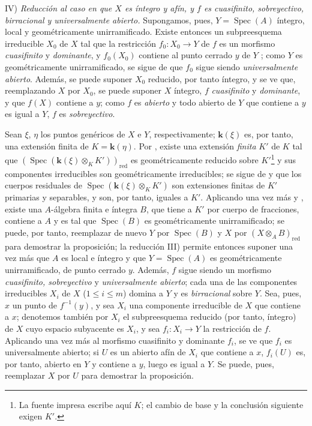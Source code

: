 IV) \emph{Reducción al caso en que $X$ es íntegro y afín, y $f$ es cuasifinito, sobreyectivo, birracional y universalmente abierto.}
Supongamos, pues, $Y=\operatorname{Spec}(A)$ íntegro, local y geométricamente unirramificado.
Existe entonces un subpreesquema irreducible $X_0$ de $X$ tal que la restricción $f_0:X_0\to Y$ de $f$ es un morfismo \emph{cuasifinito} y \emph{dominante}, y $f_0(X_0)$ contiene al punto cerrado $y$ de $Y$ ; como $Y$ es geométricamente unirramificado, se sigue de  que $f_0$ sigue siendo \emph{universalmente abierto}.
Además, se puede suponer $X_0$ reducido, por tanto íntegro, y se ve que, reemplazando $X$ por $X_0$, se puede suponer $X$ íntegro, $f$ \emph{cuasifinito} y \emph{dominante}, y que $f(X)$ contiene a $y$; como $f$ es \emph{abierto} y todo abierto de $Y$ que contiene a $y$ es igual a $Y$, $f$ es \emph{sobreyectivo}.

Sean $\xi$, $\eta$ los puntos genéricos de $X$ e $Y$, respectivamente; $\boldsymbol{k}(\xi)$ es, por tanto, una extensión finita de $K=\boldsymbol{k}(\eta)$.
Por , existe una extensión \emph{finita} $K'$ de $K$ tal que $(\operatorname{Spec}(\boldsymbol{k}(\xi)\otimes_K K'))_{\mathrm{red}}$ es geométricamente reducido sobre $K'$\footnote{La fuente impresa escribe aquí $K$; el cambio de base y la conclusión siguiente exigen $K'$.} y sus componentes irreducibles son geométricamente irreducibles; se sigue de  y  que los cuerpos residuales de $\operatorname{Spec}(\boldsymbol{k}(\xi)\otimes_K K')$ son extensiones finitas de $K'$ primarias y separables, y son, por tanto, iguales a $K'$.
Aplicando una vez más  y , existe una $A$-álgebra finita e íntegra $B$, que tiene a $K'$ por cuerpo de fracciones, contiene a $A$ y es tal que $\operatorname{Spec}(B)$ es geométricamente unirramificado; se puede, por tanto, reemplazar de nuevo $Y$ por $\operatorname{Spec}(B)$ y $X$ por $(X\otimes_A B)_{\mathrm{red}}$ para demostrar la proposición; la reducción III) permite entonces suponer una vez más que $A$ es local e íntegro y que $Y=\operatorname{Spec}(A)$ es geométricamente unirramificado, de punto cerrado $y$.
Además, $f$ sigue siendo un morfismo \emph{cuasifinito, sobreyectivo} y \emph{universalmente abierto}; cada una de las componentes irreducibles $X_i$ de $X$ ($1\leq i\leq m$) domina a $Y$  y es \emph{birracional} sobre $Y$.
Sea, pues, $x$ un punto de $f^{-1}(y)$, y sea $X_i$ una componente irreducible de $X$ que contiene a $x$; denotemos también por $X_i$ el subpreesquema reducido (por tanto, íntegro) de $X$ cuyo espacio subyacente es $X_i$, y sea $f_i:X_i\to Y$ la restricción de $f$.
Aplicando una vez más  al morfismo cuasifinito y dominante $f_i$, se ve que $f_i$ es universalmente abierto; si $U$ es un abierto afín de $X_i$ que contiene a $x$, $f_i(U)$ es, por tanto,
abierto en $Y$ y contiene a $y$, luego es igual a $Y$.
Se puede, pues, reemplazar $X$ por $U$ para demostrar la proposición.

